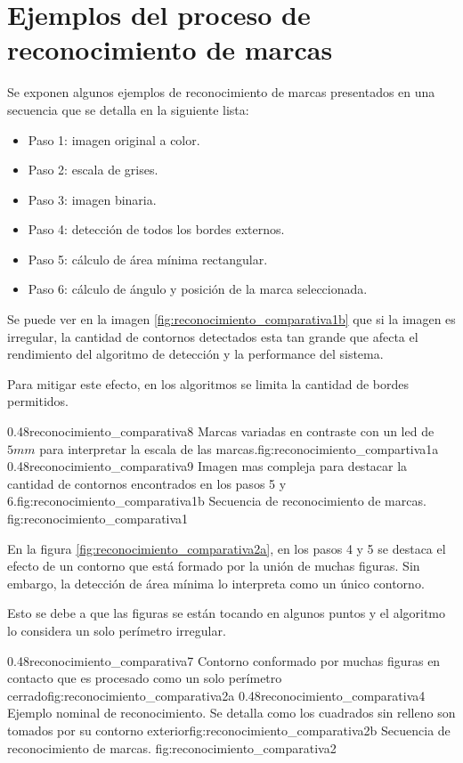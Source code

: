 
\chapter{Ejemplos del proceso de reconocimiento de marcas} %
\label{AppendixA} %

         Se exponen algunos ejemplos de reconocimiento de marcas presentados en una secuencia que se detalla en la siguiente lista:
         \begin{itemize}
            \item{Paso 1: imagen original a color.}
            \item{Paso 2: escala de grises.}
            \item{Paso 3: imagen binaria.}
            \item{Paso 4: detección de todos los bordes externos.}
            \item{Paso 5: cálculo de área mínima rectangular.}
            \item{Paso 6: cálculo de ángulo y posición de la marca seleccionada.}
         \end{itemize}

         Se puede ver en la imagen \ref{fig:reconocimiento_comparativa1b} que si la imagen es irregular, la cantidad de contornos detectados esta tan grande que afecta el rendimiento del algoritmo de detección y la performance del sistema. \par
         Para mitigar este efecto, en los algoritmos se limita la cantidad de bordes permitidos.

\subfigab
         {0.48}{reconocimiento_comparativa8} {Marcas variadas en contraste con un led de $5mm$ para interpretar la escala de las marcas.}{fig:reconocimiento_compartiva1a}
         {0.48}{reconocimiento_comparativa9} {Imagen mas compleja para destacar la cantidad de contornos encontrados en los pasos 5 y 6.}{fig:reconocimiento_comparativa1b}
         {Secuencia de reconocimiento de marcas.}
         {fig:reconocimiento_comparativa1}

         En la figura \ref{fig:reconocimiento_comparativa2a}, en los pasos 4 y 5 se destaca el efecto de un contorno que está formado por la unión de muchas figuras. Sin embargo, la detección de área mínima lo interpreta como un único contorno.\par Esto se debe a que las figuras se están tocando en algunos puntos y el algoritmo lo considera un solo perímetro irregular.

\subfigab
         {0.48}{reconocimiento_comparativa7} {Contorno conformado por muchas figuras en contacto que es procesado como un solo perímetro cerrado}{fig:reconocimiento_comparativa2a}
         {0.48}{reconocimiento_comparativa4} {Ejemplo nominal de reconocimiento. Se detalla como los cuadrados sin relleno son tomados por su contorno exterior}{fig:reconocimiento_comparativa2b}
         {Secuencia de reconocimiento de marcas.}
         {fig:reconocimiento_comparativa2}



